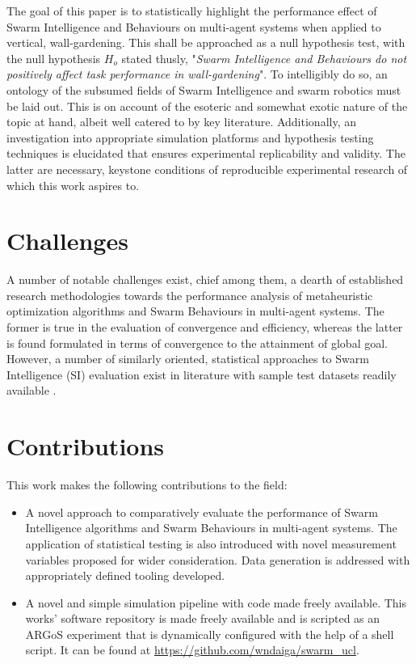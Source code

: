 \documentclass{report}
\begin{document}
The goal of this paper is to statistically highlight the performance effect of Swarm Intelligence and Behaviours on multi-agent systems when applied to vertical, wall-gardening. This shall be approached as a null hypothesis test, with the null hypothesis $H_o$ stated thusly, "\textit{Swarm Intelligence and Behaviours do not positively affect task performance in wall-gardening}". To intelligibly do so, an ontology of the subsumed fields of Swarm Intelligence and swarm robotics must be laid out. This is on account of the esoteric and somewhat exotic nature of the topic at hand, albeit well catered to by key literature. Additionally, an investigation into appropriate simulation platforms and hypothesis testing techniques is elucidated that ensures experimental replicability and validity. The latter are necessary, keystone conditions of reproducible experimental research of which this work aspires to.

\section{Challenges}
A number of notable challenges exist, chief among them, a dearth of established research methodologies towards the performance analysis of metaheuristic optimization algorithms \cite{Yang2011} and Swarm Behaviours in multi-agent systems. The former is true in the evaluation of convergence and efficiency, whereas the latter is found formulated in terms of convergence to the attainment of global goal.
However, a number of similarly oriented, statistical approaches to Swarm Intelligence (SI) evaluation exist in literature \cite{Selvi2010} \cite{Yang2011} with sample test datasets readily available \cite{Gerhard1991}.

\section{Contributions}
This work makes the following contributions to the field:

\begin{itemize}
	\item A novel approach to comparatively evaluate the performance of Swarm Intelligence algorithms and Swarm Behaviours in multi-agent systems. The application of statistical testing is also introduced with novel measurement variables proposed for wider consideration. Data generation is addressed with appropriately defined tooling developed.
	\item A novel and simple simulation pipeline with code made freely available. This works' software repository is made freely available and is scripted as an ARGoS experiment that is dynamically configured with the help of a shell script. It can be found at \url{https://github.com/wndaiga/swarm_ucl}.
\end{itemize}
\end{document}
